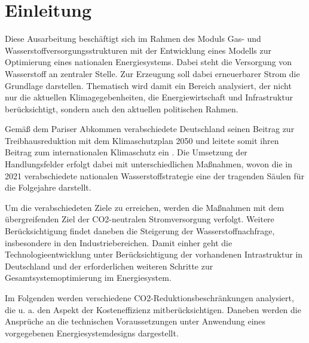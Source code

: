 \section{Einleitung}

Diese Ausarbeitung beschäftigt sich im Rahmen des Moduls Gas- und Wasserstoffversorgungsstrukturen mit der Entwicklung eines Modells zur Optimierung eines nationalen Energiesystems. Dabei steht die Versorgung von Wasserstoff an zentraler Stelle. Zur Erzeugung soll dabei erneuerbarer Strom die Grundlage darstellen. Thematisch wird damit ein Bereich analysiert, der nicht nur die aktuellen Klimagegebenheiten, die Energiewirtschaft und Infrastruktur berücksichtigt, sondern auch den aktuellen politischen Rahmen.   

Gemäß dem Pariser Abkommen verabschiedete Deutschland seinen Beitrag zur Treibhausreduktion mit dem Klimaschutzplan 2050 und leitete somit ihren Beitrag zum internationalen Klimaschutz ein . 
Die Umsetzung der Handlungsfelder erfolgt dabei mit unterschiedlichen Maßnahmen, wovon die in 2021 verabschiedete nationalen Wasserstoffstrategie eine der tragenden Säulen für die Folgejahre darstellt.  

Um die verabschiedeten Ziele zu erreichen, werden die Maßnahmen mit dem übergreifenden Ziel der CO2-neutralen Stromversorgung verfolgt. Weitere Berücksichtigung findet daneben die Steigerung der Wasserstoffnachfrage, insbesondere in den Industriebereichen. Damit einher geht die Technologieentwicklung unter Berücksichtigung der vorhandenen Intrastruktur in Deutschland und der erforderlichen weiteren Schritte zur Gesamtsystemoptimierung im Energiesystem. 

Im Folgenden werden verschiedene CO2-Reduktionsbeschränkungen analysiert, die u. a. den Aspekt der Kosteneffizienz mitberücksichtigen. Daneben werden die Ansprüche an die technischen Voraussetzungen unter Anwendung eines vorgegebenen Energiesystemdesigns dargestellt.

